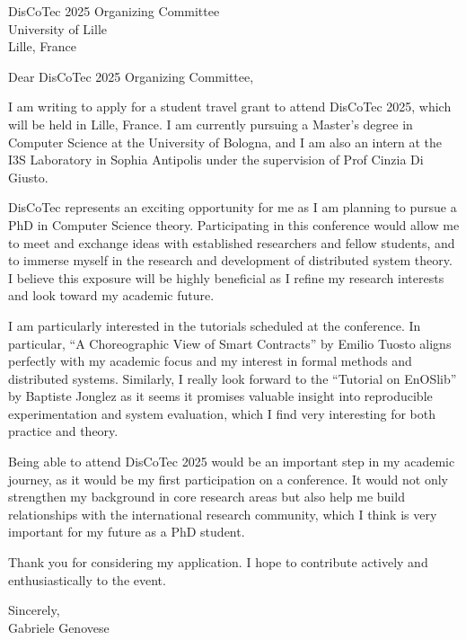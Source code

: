\documentclass[11pt,a4paper]{letter}
\begin{document}
\begin{letter}{DisCoTec 2025 Organizing Committee\\
University of Lille\\
Lille, France}

\opening{Dear DisCoTec 2025 Organizing Committee,}

I am writing to apply for a student travel grant to attend DisCoTec 2025, which will be 
held in Lille, France. I am currently pursuing a Master's degree in Computer Science 
at the University of Bologna, and I am also an intern at the I3S Laboratory in Sophia 
Antipolis under the supervision of Prof Cinzia Di Giusto.

DisCoTec represents an exciting opportunity for me as I am planning to pursue a PhD in 
Computer Science theory. Participating in this conference would allow me to meet and exchange 
ideas with established researchers and fellow students, and to immerse myself in 
the research and development of distributed system theory. I believe 
this exposure will be highly beneficial as I refine my research interests and look 
toward my academic future.

I am particularly interested in the tutorials scheduled at the conference. In 
particular, ``A Choreographic View of Smart Contracts'' by Emilio Tuosto aligns 
perfectly with my academic focus and my interest in formal methods and distributed 
systems. Similarly, I really look forward to the ``Tutorial on EnOSlib'' by Baptiste Jonglez 
as it seems it promises valuable 
insight into reproducible experimentation and system evaluation, which I find very interesting for 
both practice and theory.

Being able to attend DisCoTec 2025 would be an important step in my academic journey,
as it would be my first participation on a conference. 
It would not only strengthen my background in core research areas but also help me 
build relationships with the international research community, which I think is very
important for my future as a PhD student.

Thank you for considering my application. I hope to contribute actively and 
enthusiastically to the event.

\closing{Sincerely,\\[1.5ex]Gabriele Genovese}

\end{letter}
\end{document}
